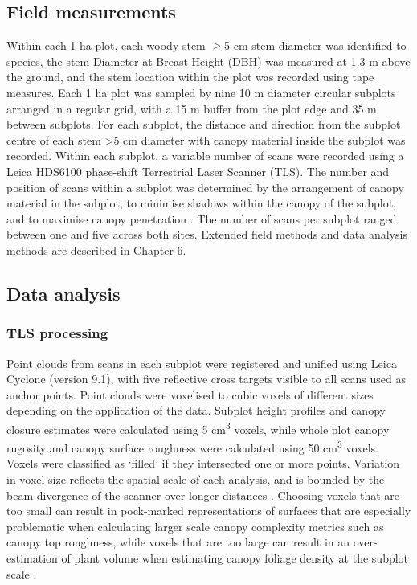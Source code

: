 \documentclass[11pt,a4paper]{article}
\begin{document}
\subsection{Field measurements}

Within each 1 ha plot, each woody stem $\geq$5 cm stem diameter was identified to species, the stem Diameter at Breast Height (DBH) was measured at 1.3 m above the ground, and the stem location within the plot was recorded using tape measures. Each 1 ha plot was sampled by nine 10 m diameter circular subplots arranged in a regular grid, with a 15 m buffer from the plot edge and 35 m between subplots. For each subplot, the distance and direction from the subplot centre of each stem >5 cm diameter with canopy material inside the subplot was recorded. Within each subplot, a variable number of scans were recorded using a Leica HDS6100 phase-shift Terrestrial Laser Scanner (TLS). The number and position of scans within a subplot was determined by the arrangement of canopy material in the subplot, to minimise shadows within the canopy of the subplot, and to maximise canopy penetration \citep{Beland2021b}. The number of scans per subplot ranged between one and five across both sites. Extended field methods and data analysis methods are described in Chapter 6.

\subsection{Data analysis}

\subsubsection{TLS processing}

Point clouds from scans in each subplot were registered and unified using Leica Cyclone (version 9.1), with five reflective cross targets visible to all scans used as anchor points. Point clouds were voxelised to cubic voxels of different sizes depending on the application of the data. Subplot height profiles and canopy closure estimates  were calculated using 5 cm\textsuperscript{3} voxels, while whole plot canopy rugosity and canopy surface roughness were calculated using 50 cm\textsuperscript{3} voxels. Voxels were classified as `filled' if they intersected one or more points. Variation in voxel size reflects the spatial scale of each analysis, and is bounded by the beam divergence of the scanner over longer distances \citep{Cifuentes2014}. Choosing voxels that are too small can result in pock-marked representations of surfaces that are especially problematic when calculating larger scale canopy complexity metrics such as canopy top roughness, while voxels that are too large can result in an over-estimation of plant volume when estimating canopy foliage density at the subplot scale \citep{Seidel2012, Cifuentes2014}. 
\end{document}
